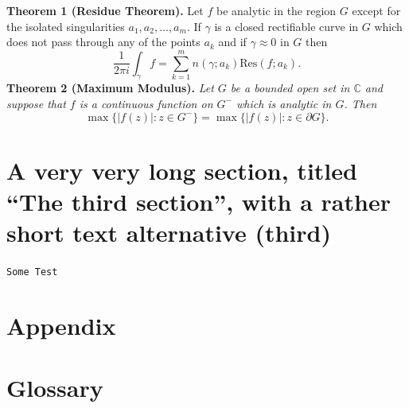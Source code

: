 \documentclass[11pt,mscthesis,report]{eapsthesis}
\begin{document}
\textbf{Theorem 1 (Residue Theorem).}
Let $f$ be analytic in the region $G$ except for the isolated singularities $a_1,a_2,\ldots,a_m$. If $\gamma$ is a closed rectifiable curve in $G$ which does not pass through any of the points $a_k$ and if $\gamma\approx 0$ in $G$ then
\[
\frac{1}{2\pi i}\int_\gamma f = \sum_{k=1}^m n(\gamma;a_k) \text{Res}(f;a_k).
\]
\textbf{Theorem 2 (Maximum Modulus).}
\emph{Let $G$ be a bounded open set in $\mathbb{C}$ and suppose that $f$ is a continuous function on $G^-$ which is analytic in $G$. Then}
\[
\max\{|f(z)|:z\in G^-\}=\max \{|f(z)|:z\in \partial G \}.
\]

\section[third]{A very very long section, titled ``The third section'', with
  a rather  short text alternative (third)}
\lipsum \texttt{Some Test}

\nocite{*}

\appendix %

\section{Appendix}
\lipsum 

\backmatter

\section{Glossary} %

\printbibliography


\end{document}
